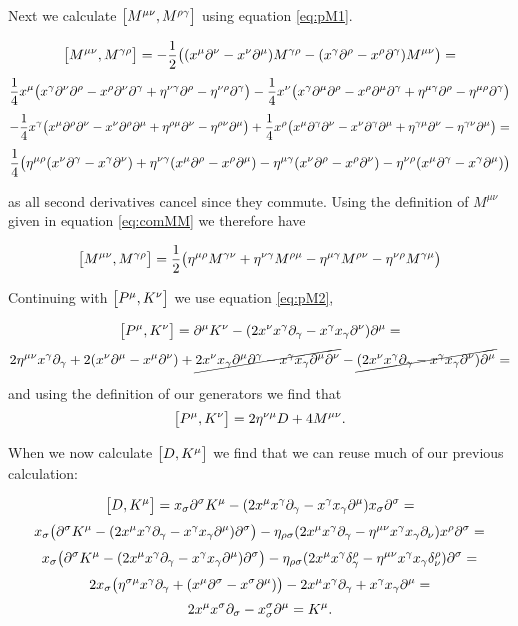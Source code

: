     
Next we calculate $\big[M^{\mu \nu}, M^{\rho \gamma}\big]$ using equation \eqref{eq:pM1}.

$$
\big[M^{\mu \nu}, M^{\gamma \rho}\big]=-\frac{1}{2}
\big( (x^\mu\partial^\nu-x^\nu\partial^\mu)M^{\gamma\rho}
-(x^\gamma \partial^\rho-x^\rho \partial^\gamma)M^{\mu\nu}\big)=
$$
$$
\frac{1}{4}x^\mu\big( x^\gamma \partial ^\nu \partial^\rho 
    -x^\rho \partial ^\nu \partial^\gamma
    +\eta^{\nu \gamma} \partial^\rho
    -\eta^{\nu \rho} \partial^\gamma \big)
-
\frac{1}{4}x^\nu\big( x^\gamma \partial ^\mu \partial^\rho 
    -x^\rho \partial ^\mu \partial^\gamma
    +\eta^{\mu \gamma} \partial^\rho
    -\eta^{\mu \rho} \partial^\gamma \big)
$$
$$
-\frac{1}{4}x^\gamma\big( x^\mu \partial ^\rho \partial^\nu 
    -x^\nu \partial ^\rho \partial^\mu
    +\eta^{\rho \mu} \partial^\nu
    -\eta^{\rho \nu} \partial^\mu \big)
+
\frac{1}{4}x^\rho\big( x^\mu \partial ^\gamma \partial^\nu 
    -x^\nu \partial ^\gamma \partial^\mu
    +\eta^{\gamma \mu} \partial^\nu
    -\eta^{\gamma \nu} \partial^\mu \big)=
$$
$$
\frac{1}{4}\big(
\eta^{\mu \rho}(x^\nu\partial^\gamma-x^\gamma \partial^\nu)
+\eta^{\nu \gamma}(x^\mu\partial^\rho-x^\rho \partial^\mu)
-\eta^{\mu \gamma}(x^\nu\partial^\rho-x^\rho\partial^\nu)
-\eta^{\nu \rho}(x^\mu \partial^\gamma-x^\gamma\partial^\mu)
\big)
$$

as all second derivatives cancel since they commute. Using the definition of $M^{\mu \nu}$ given in equation \ref{eq:comMM} we therefore have

$$
\big[M^{\mu \nu}, M^{\gamma \rho}\big]=
\frac{1}{2}\big(
\eta^{\mu \rho}M^{\gamma \nu}
+\eta^{\nu \gamma}M^{\rho \mu}
-\eta^{\mu \gamma}M^{\rho \nu}
-\eta^{\nu \rho}M^{\gamma \mu}
\big)
$$

Continuing with $\big[P^{\mu}, K^{\nu}\big]$ we use equation \eqref{eq:pM2}, 

$$\big[P^{\mu}, K^{\nu}\big] = \partial^{\mu}K^\nu
-(2x^{\nu}x^{\gamma}\partial_{\gamma}-x^{\gamma}x_{\gamma}\partial^{\nu})\partial^{\mu}=$$
$$2\eta^{\mu \nu}x^\gamma \partial_\gamma
    + 2(x^\nu \partial^\mu-x^\mu\partial^\nu)
    + \cancel{2x^\nu x_\gamma \partial^\mu \partial^\gamma
    - x^\gamma x_\gamma \partial^\mu \partial^\nu}
    -\cancel{(2x^{\nu}x^{\gamma}\partial_{\gamma}-
    x^{\gamma}x_{\gamma}\partial^{\nu})\partial^{\mu}}=
$$

and using the definition of our generators we find that
$$\big[P^{\mu}, K^{\nu}\big]=2\eta^{\nu\mu}D+4M^{\mu\nu}.$$

When we now calculate $\big[D, K^{\mu}\big]$ we find that we can reuse much of our previous calculation:

$$\big[D, K^{\mu}\big]=x_{\sigma}\partial{^\sigma}K^\mu
-(2x^{\mu}x^{\gamma}\partial_{\gamma}-x^{\gamma}x_{\gamma}\partial^{\mu})x_{\sigma}\partial^{\sigma}=$$
$$
x_\sigma\big(\partial{^\sigma}K^\mu
-(2x^{\mu}x^{\gamma}\partial_{\gamma}-x^{\gamma}x_{\gamma}\partial^{\mu})\partial^{\sigma}\big)
-\eta_{\rho\sigma}(2x^\mu x^\gamma\partial_\gamma
-\eta^{\mu\nu}x^\gamma x_\gamma\partial_\nu)x^\rho\partial^\sigma=
$$
$$
x_\sigma\big(\partial{^\sigma}K^\mu
-(2x^{\mu}x^{\gamma}\partial_{\gamma}-x^{\gamma}x_{\gamma}\partial^{\mu})\partial^{\sigma}\big)
-\eta_{\rho\sigma}(2x^\mu x^\gamma\delta_\gamma^\rho
-\eta^{\mu\nu}x^\gamma x_\gamma\delta_\nu^\rho)\partial^\sigma=
$$
$$
2x_\sigma\big(\eta^{\sigma \mu}x^\gamma \partial_\gamma
    + (x^\mu \partial^\sigma-x^\sigma\partial^\mu)\big)
    -2x^\mu x^\gamma\partial_\gamma
    +x^\gamma x_\gamma\partial^\mu=
$$
$$
2x^\mu x^\sigma\partial_\sigma-x^\sigma_\sigma\partial^\mu=K^\mu.
$$

